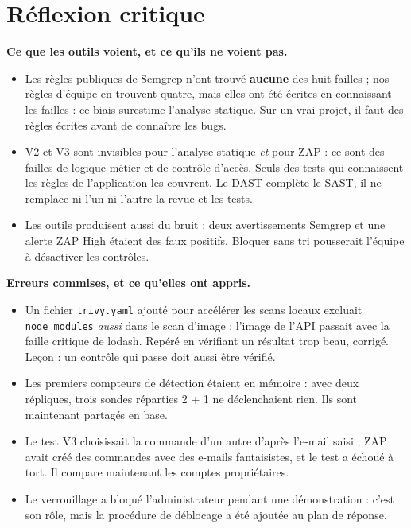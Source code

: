 \documentclass[11pt,a4paper]{article}
\newcommand{\code}[1]{\texttt{\small #1}}
\begin{document}
\section{Réflexion critique}

\textbf{Ce que les outils voient, et ce qu'ils ne voient pas.}
\begin{itemize}
  \item Les règles publiques de Semgrep n'ont trouvé \textbf{aucune} des huit failles ; nos règles
  d'équipe en trouvent quatre, mais elles ont été écrites en connaissant les failles : ce biais surestime
  l'analyse statique. Sur un vrai projet, il faut des règles écrites avant de connaître les bugs.
  \item V2 et V3 sont invisibles pour l'analyse statique \emph{et} pour ZAP : ce sont des failles de
  logique métier et de contrôle d'accès. Seuls des tests qui connaissent les règles de l'application les
  couvrent. Le DAST complète le SAST, il ne remplace ni l'un ni l'autre la revue et les tests.
  \item Les outils produisent aussi du bruit : deux avertissements Semgrep et une alerte ZAP High étaient
  des faux positifs. Bloquer sans tri pousserait l'équipe à désactiver les contrôles.
\end{itemize}

\textbf{Erreurs commises, et ce qu'elles ont appris.}
\begin{itemize}
  \item Un fichier \code{trivy.yaml} ajouté pour accélérer les scans locaux excluait \code{node\_modules}
  \emph{aussi} dans le scan d'image : l'image de l'API passait avec la faille critique de lodash. Repéré en
  vérifiant un résultat trop beau, corrigé. Leçon : un contrôle qui passe doit aussi être vérifié.
  \item Les premiers compteurs de détection étaient en mémoire : avec deux répliques, trois sondes
  réparties 2 + 1 ne déclenchaient rien. Ils sont maintenant partagés en base.
  \item Le test V3 choisissait \og la commande d'un autre \fg{} d'après l'e-mail saisi ; ZAP avait créé
  des commandes avec des e-mails fantaisistes, et le test a échoué à tort. Il compare maintenant les
  comptes propriétaires.
  \item Le verrouillage a bloqué l'administrateur pendant une démonstration : c'est son rôle, mais la
  procédure de déblocage a été ajoutée au plan de réponse.
\end{itemize}
\end{document}
